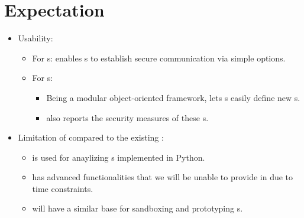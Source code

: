 \section{Expectation}

\begin{itemize}
\item Usability:
  \begin{itemize}
  \item For \eu s: \cry{} enables \eu s to establish
    secure communication via simple \cl{} options.
  \item For \cg s:
    \begin{itemize}
    \item Being a modular object-oriented framework,
      \cry{} lets \cg s easily define new \cs s.
    \item \cry{} also reports the security measures
      of these \cs s.
    \end{itemize}
\end{itemize}
\item Limitation of \cry{} compared to
  the existing \charm{} \cf:
  \begin{itemize}
  \item \charm{} is used for anaylizing \cs s
    implemented in Python.
  \item \charm{} has advanced functionalities
    that we will be unable to provide in \cry{}
    due to time constraints.
  \item \cry{} will have a similar base for sandboxing
    and prototyping \cs s.
  \end{itemize}
\end{itemize}

